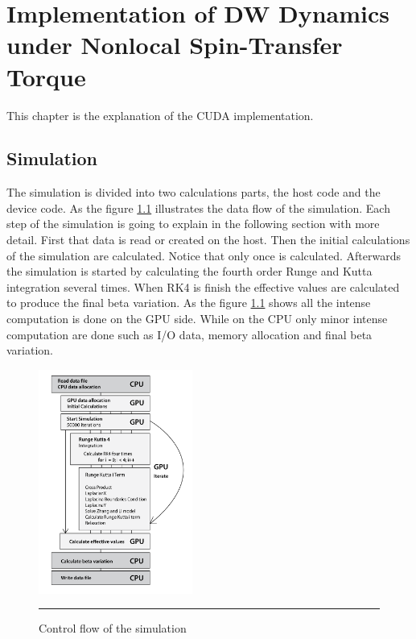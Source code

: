 
\chapter{Implementation of DW Dynamics under Nonlocal Spin-Transfer Torque} %

\label{Implementation of DW Dynamics under Nonlocal Spin-Transfer Torque} %


This chapter is the explanation of the CUDA implementation.




\section{Simulation}

The simulation is divided into two calculations parts, the host code and the device code. As the figure \ref{fig:flow} illustrates the data flow of the simulation. Each step of the simulation is going to explain in the following section with more detail. First that data is read or created on the host. Then the initial calculations of the simulation are calculated. Notice that only once is calculated. Afterwards the simulation is started by calculating the fourth order Runge and Kutta integration several times. When RK4 is finish the effective values are calculated to produce the final beta variation. As the figure \ref{fig:flow} shows all the intense computation is done on the GPU side. While on the  CPU only minor intense computation are done such as I/O data, memory allocation and final beta variation. 

\begin{figure}[htbp]
	\centering
		\includegraphics[width=0.45\textwidth]{Figures/flow.png}
		\rule{35em}{0.2pt}
	\caption[Control flow]{Control flow of the simulation}
	\label{fig:flow}
\end{figure}

